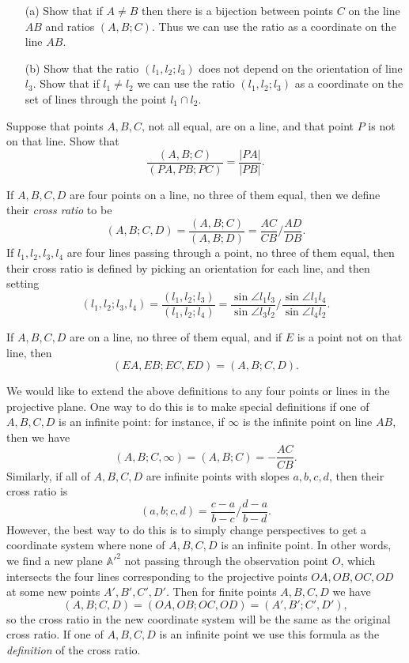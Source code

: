\begin{exer}
\begin{itemize}
\item[(a)] Show that if $A\ne B$ then there is a bijection between points $C$ on the line $AB$ and ratios $(A,B;C)$. Thus we can use the ratio as a coordinate on the line $AB$.
\item[(b)] Show that the ratio $(l_1,l_2;l_3)$ does not depend on the orientation of line $l_3$. Show that if $l_1 \ne l_2$ we can use the ratio $(l_1,l_2;l_3)$ as a coordinate on the set of lines through the point $l_1\cap l_2$.
\end{itemize}
\end{exer}

\begin{exer}
Suppose that points $A,B,C$, not all equal, are on a line, and that point $P$ is not on that line. Show that
\[
\frac{(A,B;C)}{(PA,PB;PC)} = \frac{|PA|}{|PB|}.
\]
\end{exer}

\begin{defn} If $A,B,C,D$ are four points on a line, no three of them equal, then we define their \emph{cross ratio} to be
\[
(A,B;C,D) = \frac{(A,B;C)}{(A,B;D)} = \frac{AC}{CB}\bigg/\frac{AD}{DB}.
\]
If $l_1,l_2,l_3,l_4$ are four lines passing through a point, no three of them equal, then their cross ratio is defined by picking an orientation for each line, and then setting
\[
(l_1,l_2;l_3,l_4) = \frac{(l_1,l_2;l_3)}{(l_1,l_2;l_4)} = \frac{\sin\angle l_1l_3}{\sin \angle l_3l_2}\bigg/\frac{\sin\angle l_1l_4}{\sin\angle l_4l_2}.
\]
\end{defn}

\begin{thm} If $A,B,C,D$ are on a line, no three of them equal, and if $E$ is a point not on that line, then
\[
(EA,EB;EC,ED) = (A,B;C,D).
\]
\end{thm}

We would like to extend the above definitions to any four points or lines in the projective plane. One way to do this is to make special definitions if one of $A,B,C,D$ is an infinite point: for instance, if $\infty$ is the infinite point on line $AB$, then we have
\[
(A,B;C,\infty) = (A,B;C) = -\frac{AC}{CB}.
\]
Similarly, if all of $A,B,C,D$ are infinite points with slopes $a,b,c,d$, then their cross ratio is
\[
(a,b;c,d) = \frac{c-a}{b-c}\bigg/\frac{d-a}{b-d}.
\]
However, the best way to do this is to simply change perspectives to get a coordinate system where none of $A,B,C,D$ is an infinite point. In other words, we find a new plane $\mathbb{A'}^2$ not passing through the observation point $O$, which intersects the four lines corresponding to the projective points $OA,OB,OC,OD$ at some new points $A',B',C',D'$. Then for finite points $A,B,C,D$ we have
\[
(A,B;C,D) = (OA,OB;OC,OD) = (A',B';C',D'),
\]
so the cross ratio in the new coordinate system will be the same as the original cross ratio. If one of $A,B,C,D$ is an infinite point we use this formula as the \emph{definition} of the cross ratio.

